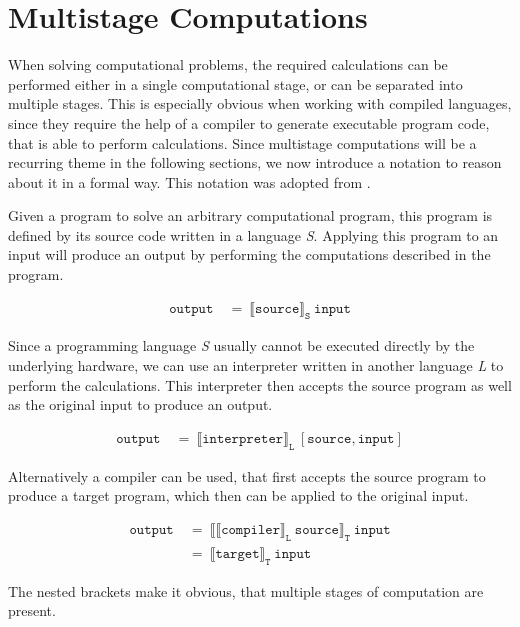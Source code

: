 
\section{Multistage Computations}\label{sec:multistage}

When solving computational problems, the required calculations can be performed either in a single computational stage, or can be separated into multiple stages.
This is especially obvious when working with compiled languages, since they require the help of a compiler to generate executable program code, that is able to perform calculations.
Since multistage computations will be a recurring theme in the following sections, we now introduce a notation to reason about it in a formal way. This notation was adopted from . %

Given a program to solve an arbitrary computational program, this program is defined by its source code written in a language \textit{S}.
Applying this program to an input will produce an output by performing the computations described in the program.

\begin{align*}
  \mathtt{output}\ &=\ \llbracket \mathtt{source} \rrbracket_{\mathtt{S}}\ \mathtt{input}
\end{align*}

Since a programming language \textit{S} usually cannot be executed directly by the underlying hardware, we can use an interpreter written in another language \textit{L} to perform the calculations.
This interpreter then accepts the source program as well as the original input to produce an output.

\begin{align*}
  \mathtt{output}\ &=\ \llbracket \mathtt{interpreter} \rrbracket_{\mathtt{L}}\ [\mathtt{source}, \mathtt{input}]
\end{align*}

Alternatively a compiler can be used, that first accepts the source program to produce a target program, which then can be applied to the original input.

\begin{align*}
  \mathtt{output}\ &=\ \llbracket \llbracket \mathtt{compiler} \rrbracket_{\mathtt{L}}\ \mathtt{source} \rrbracket_{\mathtt{T}}\ \mathtt{input} \\
  &=\ \llbracket \mathtt{target} \rrbracket_{\mathtt{T}}\ \mathtt{input}
\end{align*}

The nested brackets make it obvious, that multiple stages of computation are present. %


